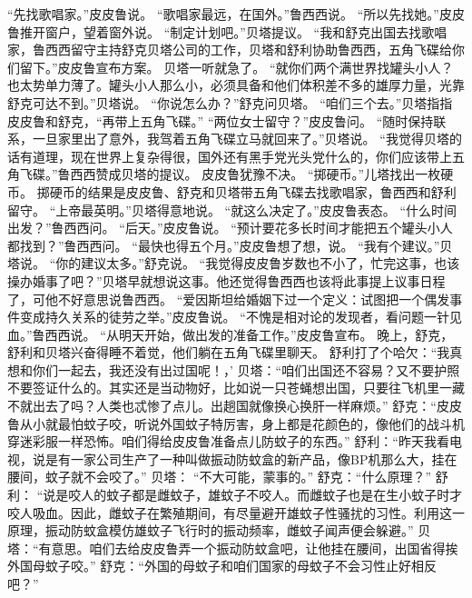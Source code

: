 \documentclass[a4paper,12pt,UTF8,twoside]{ctexbook}
\begin{document}
        “先找歌唱家。”皮皮鲁说。 
        “歌唱家最远，在国外。”鲁西西说。 
        “所以先找她。”皮皮鲁推开窗户，望着窗外说。 
        “制定计划吧。”贝塔提议。 
        “我和舒克出国去找歌唱家，鲁西西留守主持舒克贝塔公司的工作，贝塔和舒利协助鲁西西，五角飞碟给你们留下。”皮皮鲁宣布方案。 
        贝塔一听就急了。 
        “就你们两个满世界找罐头小人？也太势单力薄了。罐头小人那么小，必须具备和他们体积差不多的雄厚力量，光靠舒克可达不到。”贝塔说。 
        “你说怎么办？”舒克问贝塔。 
        “咱们三个去。”贝塔指指皮皮鲁和舒克，“再带上五角飞碟。” 
        “两位女士留守？”皮皮鲁问。 
        “随时保持联系，一旦家里出了意外，我驾着五角飞碟立马就回来了。”贝塔说。 
        “我觉得贝塔的话有道理，现在世界上复杂得很，国外还有黑手党光头党什么的，你们应该带上五角飞碟。”鲁西西赞成贝塔的提议。 
        皮皮鲁犹豫不决。 
        “掷硬币。”儿塔找出一枚硬币。 
        掷硬币的结果是皮皮鲁、舒克和贝塔带五角飞碟去找歌唱家，鲁西西和舒利留守。 
        “上帝最英明。”贝塔得意地说。 
        “就这么决定了。”皮皮鲁表态。 
        “什么时间出发？”鲁西西问。 
        “后天。”皮皮鲁说。 
        “预计要花多长时间才能把五个罐头小人都找到？”鲁西西问。 
        “最快也得五个月。”皮皮鲁想了想，说。 
        “我有个建议。”贝塔说。 
        “你的建议太多。”舒克说。 
        “我觉得皮皮鲁岁数也不小了，忙完这事，也该操办婚事了吧？”贝塔早就想说这事。他还觉得鲁西西也该将此事提上议事日程了，可他不好意思说鲁西西。 
        “爱因斯坦给婚姻下过一个定义：试图把一个偶发事件变成持久关系的徒劳之举。”皮皮鲁说。 
        “不愧是相对论的发现者，看问题一针见血。”鲁西西说。 
        “从明天开始，做出发的准备工作。”皮皮鲁宣布。 
        晚上，舒克，舒利和贝塔兴奋得睡不着觉，他们躺在五角飞碟里聊天。 
        舒利打了个哈欠：“我真想和你们一起去，我还没有出过国呢！，’ 
        贝塔：“咱们出国还不容易？又不要护照不要签证什么的。其实还是当动物好，比如说一只苍蝇想出国，只要往飞机里一藏不就出去了吗？人类也忒惨了点儿。出趟国就像换心换肝一样麻烦。” 
        舒克：“皮皮鲁从小就最怕蚊子咬，听说外国蚊子特厉害，身上都是花颜色的，像他们的战斗机穿迷彩服一样恐怖。咱们得给皮皮鲁准备点儿防蚊子的东西。” 
        舒利：“昨天我看电视，说是有一家公司生产了一种叫做振动防蚊盒的新产品，像BP机那么大，挂在腰间，蚊子就不会咬了。” 
        贝塔：  “不大可能，蒙事的。” 
        舒克：“什么原理？” 
        舒利：  “说是咬人的蚊子都是雌蚊子，雄蚊子不咬人。而雌蚊子也是在生小蚊子时才咬人吸血。因此，雌蚊子在繁殖期间，有尽量避开雄蚊子性骚扰的习性。利用这一原理，振动防蚊盒模仿雄蚊子飞行时的振动频率，雌蚊子闻声便会躲避。” 
        贝塔：“有意思。咱们去给皮皮鲁弄一个振动防蚊盒吧，让他挂在腰间，出国省得挨外国母蚊子咬。” 
        舒克：“外国的母蚊子和咱们国家的母蚊子不会习性止好相反吧？” 
\end{document}
